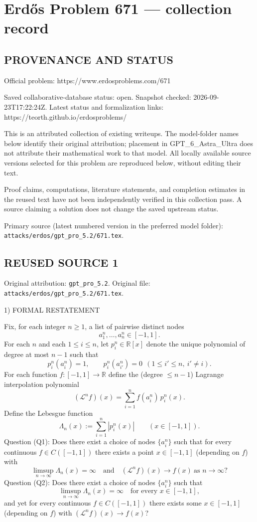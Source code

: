 \section*{Erd\H{o}s Problem 671 --- collection record}

\subsection*{PROVENANCE AND STATUS}
Official problem: https://www.erdosproblems.com/671

Saved collaborative-database status: open.
Snapshot checked: 2026-09-23T17:22:24Z.
Latest status and formalization links: https://teorth.github.io/erdosproblems/

This is an attributed collection of existing writeups. The model-folder names below identify their original attribution; placement in GPT\_6\_Astra\_Ultra does not attribute their mathematical work to that model. All locally available source versions selected for this problem are reproduced below, without editing their text.

Proof claims, computations, literature statements, and completion estimates in the reused text have not been independently verified in this collection pass. A source claiming a solution does not change the saved upstream status.

Primary source (latest numbered version in the preferred model folder): \texttt{attacks/erdos/gpt\_pro\_5.2/671.tex}.

\subsection*{REUSED SOURCE 1}
Original attribution: \texttt{gpt\_pro\_5.2}.
Original file: \texttt{attacks/erdos/gpt\_pro\_5.2/671.tex}.


1) FORMAL RESTATEMENT

Fix, for each integer $n\ge 1$, a list of pairwise distinct nodes
\[
 a_1^n,\dots,a_n^n\in[-1,1].
\]
For each $n$ and each $1\le i\le n$, let $p_i^n\in\mathbb R[x]$ denote the unique polynomial of degree at most $n-1$ such that
\[
 p_i^n(a_i^n)=1,\qquad p_i^n(a_{i'}^n)=0\ \ (1\le i'\le n,\ i'\ne i).
\]
For each function $f:[-1,1]\to\mathbb R$ define the (degree $\le n-1$) Lagrange interpolation polynomial
\[
 (\mathcal L^n f)(x)=\sum_{i=1}^n f(a_i^n)\,p_i^n(x).
\]
Define the Lebesgue function
\[
 \Lambda_n(x):=\sum_{i=1}^n |p_i^n(x)|\qquad(x\in[-1,1]).
\]
Question (Q1): Does there exist a choice of nodes $\{a_i^n\}$ such that for every continuous $f\in C([-1,1])$ there exists a point $x\in[-1,1]$ (depending on $f$) with
\[
 \limsup_{n\to\infty} \Lambda_n(x)=\infty\quad\text{and}\quad (\mathcal L^n f)(x)\to f(x)\ \text{as }n\to\infty?
\]
Question (Q2): Does there exist a choice of nodes $\{a_i^n\}$ such that
\[
 \limsup_{n\to\infty}\Lambda_n(x)=\infty\quad\text{for every }x\in[-1,1],
\]
and yet for every continuous $f\in C([-1,1])$ there exists some $x\in[-1,1]$ (depending on $f$) with $(\mathcal L^n f)(x)\to f(x)$?

